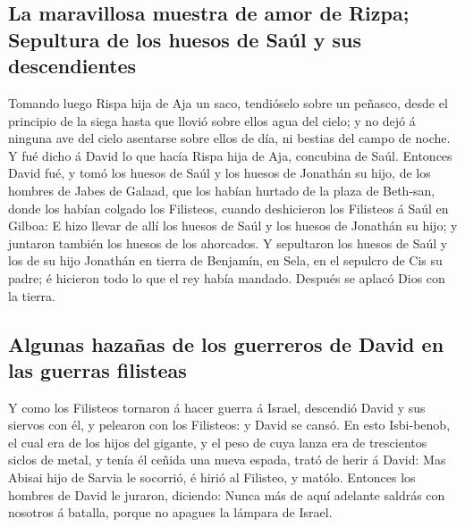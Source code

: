 \hypertarget{la-maravillosa-muestra-de-amor-de-rizpa-sepultura-de-los-huesos-de-sauxfal-y-sus-descendientes}{%
\subsection{La maravillosa muestra de amor de Rizpa; Sepultura de los
huesos de Saúl y sus
descendientes}\label{la-maravillosa-muestra-de-amor-de-rizpa-sepultura-de-los-huesos-de-sauxfal-y-sus-descendientes}}

 Tomando luego Rispa hija de Aja un saco, tendióselo
sobre un peñasco, desde el principio de la siega hasta que llovió sobre
ellos agua del cielo; y no dejó á ninguna ave del cielo asentarse sobre
ellos de día, ni bestias del campo de noche.  Y fué dicho
á David lo que hacía Rispa hija de Aja, concubina de Saúl.
 Entonces David fué, y tomó los huesos de Saúl y los
huesos de Jonathán su hijo, de los hombres de Jabes de Galaad, que los
habían hurtado de la plaza de Beth-san, donde los habían colgado los
Filisteos, cuando deshicieron los Filisteos á Saúl en Gilboa:
 E hizo llevar de allí los huesos de Saúl y los huesos de
Jonathán su hijo; y juntaron también los huesos de los ahorcados.
 Y sepultaron los huesos de Saúl y los de su hijo
Jonathán en tierra de Benjamín, en Sela, en el sepulcro de Cis su padre;
é hicieron todo lo que el rey había mandado. Después se aplacó Dios con
la tierra.

\hypertarget{algunas-hazauxf1as-de-los-guerreros-de-david-en-las-guerras-filisteas}{%
\subsection{Algunas hazañas de los guerreros de David en las guerras
filisteas}\label{algunas-hazauxf1as-de-los-guerreros-de-david-en-las-guerras-filisteas}}

 Y como los Filisteos tornaron á hacer guerra á Israel,
descendió David y sus siervos con él, y pelearon con los Filisteos: y
David se cansó.  En esto Isbi-benob, el cual era de los
hijos del gigante, y el peso de cuya lanza era de trescientos siclos de
metal, y tenía él ceñida una nueva espada, trató de herir á David:
 Mas Abisai hijo de Sarvia le socorrió, é hirió al
Filisteo, y matólo. Entonces los hombres de David le juraron, diciendo:
Nunca más de aquí adelante saldrás con nosotros á batalla, porque no
apagues la lámpara de Israel.

